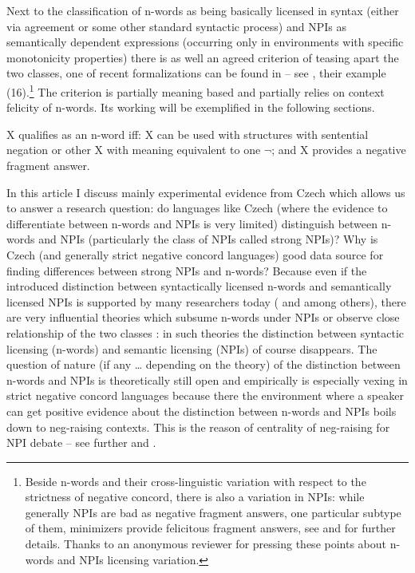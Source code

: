 \documentclass[output=paper,
]{langscibook}
\begin{document}
\noindent Next to the classification of n-words as being basically licensed in syntax (either via agreement or some other standard syntactic process) and NPIs as semantically dependent expressions (occurring only in environments with specific monotonicity properties) there is as well an agreed criterion of teasing apart the two classes, one of recent formalizations can be found in \cite{giannakidou2017landscape} -- see , their example (16).\footnote{Beside n-words and their cross-linguistic variation with respect to the strictness of negative concord, there is also a variation in NPIs: while generally NPIs are bad as negative fragment answers, one particular subtype of them, minimizers provide felicitous fragment answers, see \cite{giannakidou1998polarity} and \cite{Blasczak:2001} for further details. Thanks to an anonymous reviewer for pressing these points about n-words and NPIs licensing variation.} The criterion is partially meaning based and partially relies on context felicity of n-words. Its working will be exemplified in the following sections.

\eanoraggedright  X qualifies as an n-word iff:\label{nwords-npi-crit}
\eanoraggedright X can be used with structures with sentential negation or other X with meaning equivalent to one $\neg$; and
\ex X provides a negative fragment answer.
\z
\z

\noindent In this article I discuss mainly experimental evidence from Czech which allows us to answer a research question: do languages like Czech (where the evidence to differentiate between n-words and NPIs is very limited) distinguish between n-words and NPIs (particularly the class of NPIs called strong NPIs)? Why is Czech (and generally strict negative concord languages) good data source for finding differences between strong NPIs and n-words? Because even if the introduced distinction between syntactically licensed n-words and semantically licensed NPIs is supported by many researchers today (\citealt{zwarts1998three,zeijlstra2004sentential} and \citealt{gajewski2011licensing} among others), there are very influential theories which subsume n-words under NPIs \citep{ladusaw1992expressing} or observe close relationship of the two classes \citep{laka1990negation}: in such theories the distinction between syntactic licensing (n-words) and semantic licensing (NPIs) of course disappears. The question of nature (if any \ldots { }depending on the theory) of the distinction between n-words and NPIs is theoretically still open and empirically is especially vexing in strict negative concord languages because there the environment where a speaker can get positive evidence about the distinction between n-words and NPIs boils down to neg-raising contexts. This is the reason of centrality of neg-raising for NPI debate -- see further  and .
\end{document}
